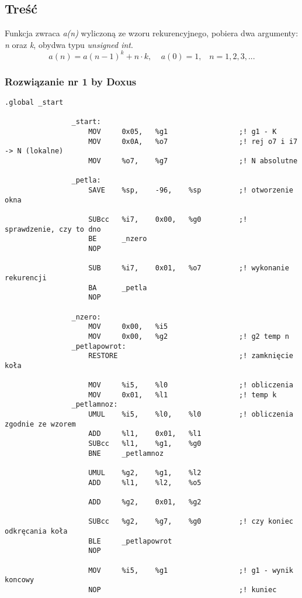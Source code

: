 	\newpage
		\subsection{Treść}
			Funkcja zwraca \emph{a(n)} wyliczoną ze wzoru rekurencyjnego, pobiera dwa argumenty: \emph{n} oraz \emph{k}, obydwa typu \textit{unsigned int}.
			$$ a(n)=a(n-1)^k+n\cdot k,\;\;\;\;a(0)=1,\;\;\;n=1,2,3,... $$
		\subsubsection{Rozwiązanie nr 1 by Doxus}
			\begin{lstlisting}[language={[sparc]Assembler}]
				.global _start
				
				_start:
					MOV		0x05,	%g1					;! g1 - K
					MOV		0x0A,	%o7					;! rej o7 i i7 -> N (lokalne)
					MOV		%o7,	%g7					;! N absolutne
				
				_petla:
					SAVE	%sp,	-96,	%sp			;! otworzenie okna
				
					SUBcc	%i7,	0x00,	%g0			;! sprawdzenie, czy to dno
					BE		_nzero
					NOP
					
					SUB		%i7,	0x01,	%o7			;! wykonanie rekurencji
					BA		_petla
					NOP
					
				_nzero:
					MOV		0x00,	%i5
					MOV		0x00,	%g2					;! g2 temp n
				_petlapowrot:
					RESTORE								;! zamknięcie koła
					
					MOV		%i5,	%l0					;! obliczenia
					MOV		0x01,	%l1					;! temp k
				_petlamnoz:
					UMUL	%i5,	%l0,	%l0			;! obliczenia zgodnie ze wzorem
					ADD		%l1,	0x01,	%l1
					SUBcc	%l1,	%g1,	%g0
					BNE		_petlamnoz
					
					UMUL	%g2,	%g1,	%l2
					ADD		%l1,	%l2,	%o5
				
					ADD		%g2,	0x01,	%g2
					
					SUBcc	%g2,	%g7,	%g0			;! czy koniec odkręcania koła
					BLE		_petlapowrot
					NOP
				
					MOV		%i5,	%g1					;! g1 - wynik koncowy
					NOP									;! kuniec
			\end{lstlisting}
		\newpage
